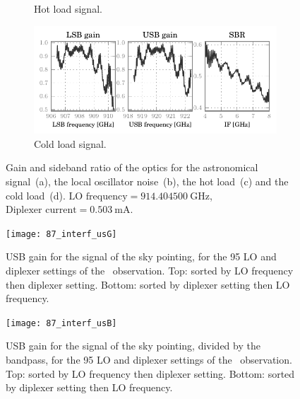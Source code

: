 \begin{figure}[p]
\begin{subfigure}[b]{\textwidth}
        \vspace{-.8em}
        \caption{Hot load signal.}
    \end{subfigure}
    \begin{subfigure}[b]{\textwidth}
        \centering
        \includegraphics[scale=.9]{87_00_00_cbb_s_lsbusbsbr}
        \vspace{-.8em}
        \caption{Cold load signal.}
    \end{subfigure}
    \caption{Gain and sideband ratio of the optics for the astronomical signal~(a),
    the local oscillator noise~(b),
    the hot load~(c)
    and the cold load~(d).
    $\text{LO frequency} = \SI{914.404500}{\giga\hertz}$,
    $\text{Diplexer current} = \SI{0.503}{\milli\ampere}$.
    }
    \label{fig:87_00_00_sky_lsbusbsbr}
\end{figure}

\begin{figure}
    \centering
    \texttt{[image: 87\_interf\_usG]}
    \caption{USB gain for the signal of the sky pointing, for the 95 LO and diplexer settings of the~ observation.
    Top: sorted by LO frequency then diplexer setting.
    Bottom: sorted by diplexer setting then LO frequency.}
    \label{fig:87_interf_usG}
\end{figure}
\begin{figure}
    \centering
    \texttt{[image: 87\_interf\_usB]}
    \caption{USB gain for the signal of the sky pointing, divided by the bandpass, for the 95 LO and diplexer settings of the~ observation.
    Top: sorted by LO frequency then diplexer setting.
    Bottom: sorted by diplexer setting then LO frequency.}
    \label{fig:87_interf_usB}
\end{figure}


